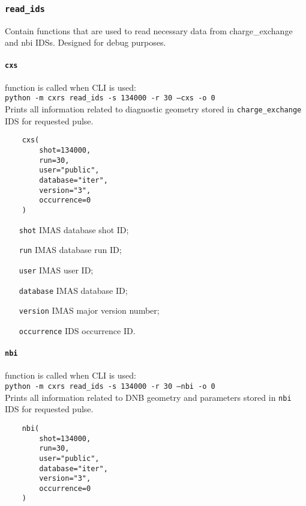 \documentclass[../../main]{subfiles}
\begin{document}
\subsubsection{\texttt{read\_ids}}

Contain functions that are used to read necessary data from charge\_exchange and nbi IDSs. Designed for debug purposes.

\paragraph{\texttt{cxs}} function is called when CLI is used:\\
\texttt{python -m cxrs read_ids -s 134000 -r 30 --cxs -o 0}\\
Prints all information related to diagnostic geometry stored in \texttt{charge\_exchange} IDS for requested pulse.

\begin{verbatim}
    cxs(
        shot=134000,
        run=30,
        user="public",
        database="iter",
        version="3",
        occurrence=0
    )
\end{verbatim}

\begin{itemize}[align=left]
    \item[\texttt{shot}] IMAS database shot ID;
    \item[\texttt{run}] IMAS database run ID;
    \item[\texttt{user}] IMAS user ID;
    \item[\texttt{database}] IMAS database ID;
    \item[\texttt{version}] IMAS major version number;
    \item[\texttt{occurrence}] IDS occurrence ID.
\end{itemize}

\paragraph{\texttt{nbi}} function is called when CLI is used:\\
\texttt{python -m cxrs read_ids -s 134000 -r 30 --nbi -o 0}\\
Prints all information related to DNB geometry and parameters stored in \texttt{nbi} IDS for requested pulse.

\begin{verbatim}
    nbi(
        shot=134000,
        run=30,
        user="public",
        database="iter",
        version="3",
        occurrence=0
    )
\end{verbatim}
\end{document}
